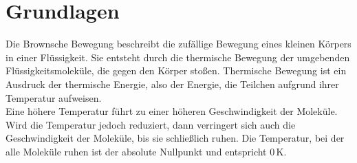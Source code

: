 \section*{Grundlagen}
Die Brownsche Bewegung beschreibt die zufällige Bewegung eines kleinen Körpers in einer Flüssigkeit. Sie entsteht durch die thermische Bewegung der umgebenden Flüssigkeitsmoleküle, die gegen den Körper stoßen.
Thermische Bewegung ist ein Ausdruck der thermische Energie, also der Energie, die Teilchen aufgrund ihrer Temperatur aufweisen.\\
Eine höhere Temperatur führt zu einer höheren Geschwindigkeit der Moleküle. Wird die Temperatur jedoch reduziert, dann verringert sich auch die Geschwindigkeit der Moleküle, bis sie schließlich ruhen. Die Temperatur, bei der alle Moleküle ruhen ist der absolute Nullpunkt und entspricht $0 \,$K.\\

